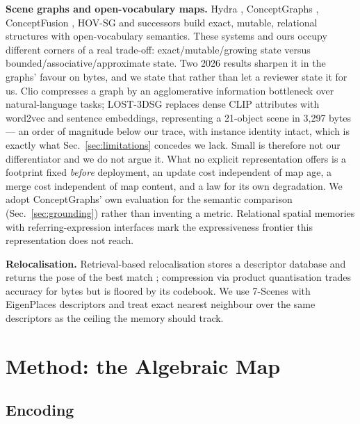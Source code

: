 \documentclass[conference]{IEEEtran}
\begin{document}
\textbf{Scene graphs and open-vocabulary maps.} Hydra
\cite{hughes2022hydra}, ConceptGraphs \cite{gu2024conceptgraphs},
ConceptFusion \cite{jatavallabhula2023conceptfusion}, HOV-SG
\cite{werby2024hovsg} and successors \cite{keysg2025} build exact,
mutable, relational structures with open-vocabulary semantics. These
systems and ours occupy different corners of a real trade-off:
exact/mutable/growing state versus bounded/associative/approximate state.
Two 2026 results sharpen it in the graphs' favour on bytes, and we state
that rather than let a reviewer state it for us. Clio
\cite{maggio2024clio} compresses a graph by an agglomerative information
bottleneck over natural-language tasks; LOST-3DSG
\cite{ferraina2026lost3dsg} replaces dense CLIP attributes with word2vec
and sentence embeddings, representing a 21-object scene in 3{,}297 bytes
--- an order of magnitude below our trace, with instance identity intact,
which is exactly what Sec.~\ref{sec:limitations} concedes we lack. Small
is therefore not our differentiator and we do not argue it. What no
explicit representation offers is a footprint fixed \emph{before}
deployment, an update cost independent of map age, a merge cost
independent of map content, and a law for its own degradation. We adopt
ConceptGraphs' own evaluation for the semantic comparison
(Sec.~\ref{sec:grounding}) rather than inventing a metric. Relational
spatial memories with referring-expression interfaces \cite{farm2026}
mark the expressiveness frontier this representation does not reach.

\textbf{Relocalisation.} Retrieval-based relocalisation stores a
descriptor database and returns the pose of the best match
\cite{sattler2019understanding}; compression via product quantisation
\cite{jegou2011product} trades accuracy for bytes but is floored by its
codebook. We use 7-Scenes \cite{shotton2013scene} with EigenPlaces
descriptors \cite{berton2023eigenplaces} and treat exact nearest
neighbour over the same descriptors as the ceiling the memory should
track.

\section{Method: the Algebraic Map}
\label{sec:method}

\subsection{Encoding}
\label{sec:encoding}
\end{document}
